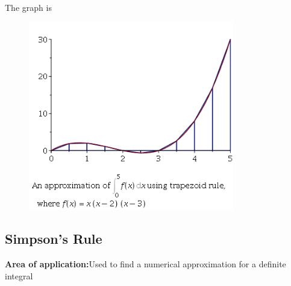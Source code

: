 \documentclass{article}
\begin{document}
The graph is
\begin{figure}[H]
	\includegraphics[width=0.8\textwidth, height=0.6\textwidth]{trap_rei.png}
\end{figure}
	\subsection{Simpson's Rule}
{\bf Area of application:}Used to find a numerical approximation for a definite integral
\end{document}
